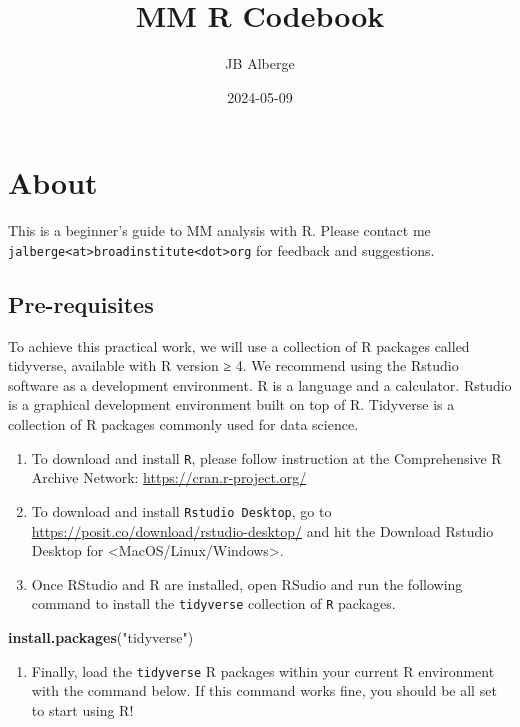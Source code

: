 \documentclass[
]{book}
\title{MM R Codebook}
\author{JB Alberge}
\date{2024-05-09}
\newenvironment{Shaded}{\begin{snugshade}}{\end{snugshade}}
\newcommand{\FunctionTok}[1]{\textcolor[rgb]{0.13,0.29,0.53}{\textbf{#1}}}
\newcommand{\NormalTok}[1]{#1}
\newcommand{\StringTok}[1]{\textcolor[rgb]{0.31,0.60,0.02}{#1}}
\providecommand{\tightlist}{%
  \setlength{\itemsep}{0pt}\setlength{\parskip}{0pt}}
\begin{document}
\maketitle

{
\setcounter{tocdepth}{1}
\tableofcontents
}
\hypertarget{about}{%
\chapter{About}\label{about}}

This is a beginner's guide to MM analysis with R. Please contact me \texttt{jalberge\textless{}at\textgreater{}broadinstitute\textless{}dot\textgreater{}org} for feedback and suggestions.

\hypertarget{pre-requisites}{%
\section{Pre-requisites}\label{pre-requisites}}

To achieve this practical work, we will use a collection of R packages called tidyverse, available with R version ≥ 4. We recommend using the Rstudio software as a development environment. R is a language and a calculator. Rstudio is a graphical development environment built on top of R. Tidyverse is a collection of R packages commonly used for data science.

\begin{enumerate}
\def\labelenumi{\arabic{enumi}.}
\item
  To download and install \texttt{R}, please follow instruction at the Comprehensive R Archive Network: \url{https://cran.r-project.org/}
\item
  To download and install \texttt{Rstudio\ Desktop}, go to \url{https://posit.co/download/rstudio-desktop/} and hit the Download Rstudio Desktop for \textless MacOS/Linux/Windows\textgreater.
\item
  Once RStudio and R are installed, open RSudio and run the following command to install the \texttt{tidyverse} collection of \texttt{R} packages.
\end{enumerate}

\begin{Shaded}
\begin{Highlighting}[]
\FunctionTok{install.packages}\NormalTok{(}\StringTok{"tidyverse"}\NormalTok{)}
\end{Highlighting}
\end{Shaded}

\begin{enumerate}
\def\labelenumi{\arabic{enumi}.}
\setcounter{enumi}{3}
\tightlist
\item
  Finally, load the \texttt{tidyverse} R packages within your current R environment with the command below. If this command works fine, you should be all set to start using R!
\end{enumerate}
\end{document}
